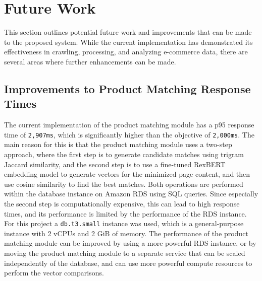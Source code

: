 \section{Future Work}\label{sec:future_work}

This section outlines potential future work and improvements that can be made to the proposed system.
While the current implementation has demonstrated its effectiveness in crawling, processing, and analyzing e-commerce data, there are several areas where further enhancements can be made.

\subsection{Improvements to Product Matching Response Times}\label{subsec:improvements-to-product-matching-response-times}
The current implementation of the product matching module has a p95 response time of \texttt{2,907ms}, which is significantly higher than the objective of \texttt{2,000ms}.
The main reason for this is that the product matching module uses a two-step approach, where the first step is to generate candidate matches using trigram Jaccard similarity, and the second step is to use a fine-tuned RexBERT embedding model to generate vectors for the minimized page content, and then use cosine similarity to find the best matches.
Both operations are performed within the database instance on Amazon RDS using SQL queries.
Since especially the second step is computationally expensive, this can lead to high response times, and its performance is limited by the performance of the RDS instance.
For this project a \texttt{db.t3.small} instance was used, which is a general-purpose instance with 2 vCPUs and 2 GiB of memory.
The performance of the product matching module can be improved by using a more powerful RDS instance, or by moving the product matching module to a separate service that can be scaled independently of the database, and can use more powerful compute resources to perform the vector comparisons.

